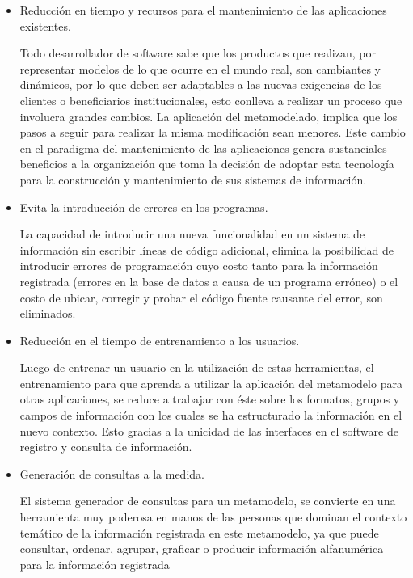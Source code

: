 \begin{itemize}
    \item Reducción en tiempo y recursos para el mantenimiento de las aplicaciones existentes.

Todo desarrollador de software sabe que los productos que realizan, por representar modelos de lo que ocurre en el mundo real, son cambiantes y dinámicos, por lo que deben ser adaptables a las nuevas exigencias de los clientes o beneficiarios institucionales, esto conlleva a realizar un proceso que involucra grandes cambios. La aplicación del metamodelado, implica que los pasos a seguir para realizar la misma modificación sean menores. Este cambio en el paradigma del mantenimiento de las aplicaciones genera sustanciales beneficios a la organización que toma la decisión de adoptar esta tecnología para la construcción y mantenimiento de sus sistemas de información.

    \item Evita la introducción de errores en los programas.

La capacidad de introducir una nueva funcionalidad en un sistema de información sin escribir líneas de código adicional, elimina la posibilidad de introducir errores de programación cuyo costo tanto para la información registrada (errores en la base de datos a causa de un programa erróneo) o el costo de ubicar, corregir y probar el código fuente causante del error, son eliminados.

    \item Reducción en el tiempo de entrenamiento a los usuarios.

Luego de entrenar un usuario en la utilización de estas herramientas, el entrenamiento para que aprenda a utilizar la aplicación del metamodelo para otras aplicaciones, se reduce a trabajar con éste sobre los formatos, grupos y campos de información con los cuales se ha estructurado la información en el nuevo contexto. Esto gracias a la unicidad de las interfaces en el software de registro y consulta de información.

    \item Generación de consultas a la medida.

El sistema generador de consultas para un metamodelo, se convierte en una herramienta muy poderosa en manos de las personas que dominan el contexto temático de la información registrada en este metamodelo, ya que puede consultar, ordenar, agrupar, graficar o producir información alfanumérica para la información registrada

\end{itemize}

